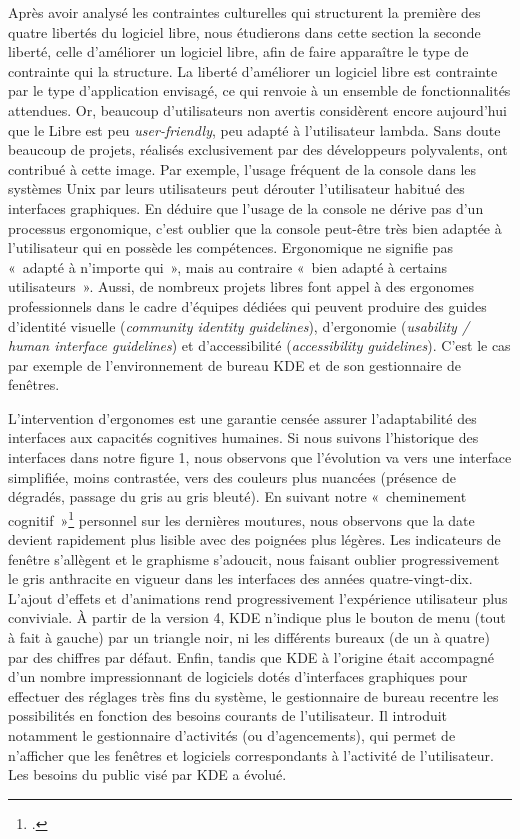 \documentclass{FramateX}
\begin{document}
\begin{refsection}
Après avoir analysé les contraintes culturelles qui structurent la
première des quatre libertés du logiciel libre, nous étudierons dans
cette section la seconde liberté, celle d'améliorer un logiciel libre,
afin de faire apparaître le type de contrainte qui la structure. La
liberté d'améliorer un logiciel libre est contrainte par le type
d'application envisagé, ce qui renvoie à un ensemble de fonctionnalités
attendues. Or, beaucoup d'utilisateurs non avertis considèrent encore
aujourd'hui que le Libre est peu \textit{user-friendly}, peu adapté à
l'utilisateur lambda. Sans doute beaucoup de projets, réalisés
exclusivement par des développeurs polyvalents, ont contribué à cette
image. Par exemple, l'usage fréquent de la console dans les systèmes
Unix par leurs utilisateurs peut dérouter l'utilisateur habitué des
interfaces graphiques. En déduire que l'usage de la console ne dérive
pas d'un processus ergonomique, c'est oublier que la console peut-être
très bien adaptée à l'utilisateur qui en possède les compétences.
Ergonomique ne signifie pas «~adapté à n'importe qui~», mais au
contraire «~bien adapté à certains utilisateurs~». Aussi, de nombreux
projets libres font appel à des ergonomes professionnels dans le cadre
d'équipes dédiées qui peuvent produire des guides d'identité visuelle
(\textit{community identity guidelines}), d'ergonomie (\textit{usability /
human interface guidelines}) et d'accessibilité
(\textit{accessibility guidelines}). C'est le cas par exemple de
l'environnement de bureau KDE et de son gestionnaire de fenêtres.

L'intervention d'ergonomes est une garantie censée assurer
l'adaptabilité des interfaces aux capacités cognitives humaines. Si
nous suivons l'historique des interfaces dans notre figure 1, nous
observons que l'évolution va vers une interface simplifiée, moins
contrastée, vers des couleurs plus nuancées (présence de dégradés,
passage du gris au gris bleuté). En suivant notre «~cheminement
cognitif~»\footnote{\cite{whartoncognitive1994}.} personnel sur les dernières
moutures, nous observons que la date devient rapidement plus lisible
avec des poignées plus légères. Les indicateurs de fenêtre s'allègent
et le graphisme s'adoucit, nous faisant oublier progressivement le gris
anthracite en vigueur dans les interfaces des années quatre-vingt-dix.
L'ajout d'effets et d'animations rend progressivement l'expérience
utilisateur plus conviviale. À partir de la version 4, KDE n'indique
plus le bouton de menu (tout à fait à gauche) par un triangle noir, ni
les différents bureaux (de un à quatre) par des chiffres par défaut.
Enfin, tandis que KDE à l'origine était accompagné d'un nombre
impressionnant de logiciels dotés d'interfaces graphiques pour
effectuer des réglages très fins du système, le gestionnaire de bureau
recentre les possibilités en fonction des besoins courants de
l'utilisateur. Il introduit notamment le gestionnaire d'activités (ou
d'agencements), qui permet de n'afficher que les fenêtres et logiciels
correspondants à l'activité de l'utilisateur. Les besoins du public
visé par KDE a évolué. 


\end{refsection}
\end{document}
